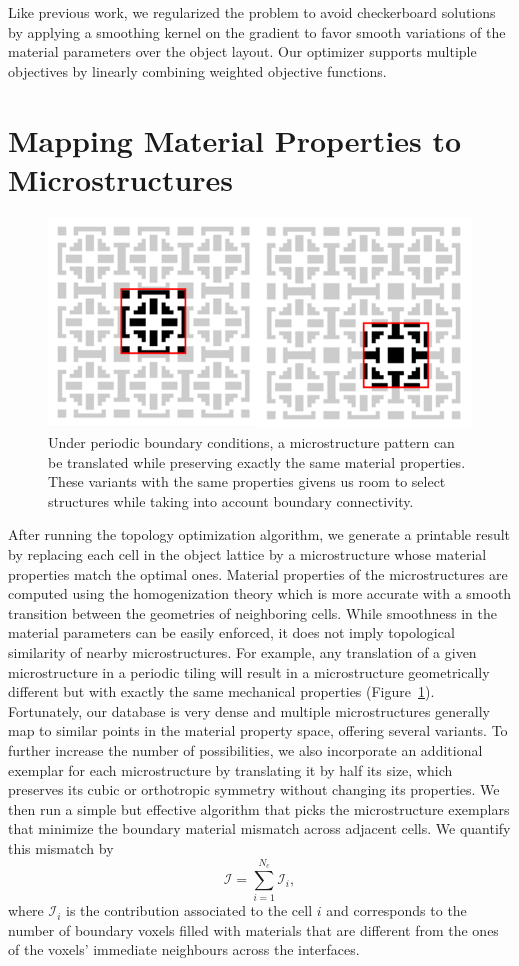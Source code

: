 Like previous work, we regularized the problem to avoid checkerboard solutions by applying a smoothing kernel on the 
gradient to favor smooth variations of the material parameters over the object layout.
Our optimizer supports multiple objectives by linearly combining weighted objective functions.
\section{Mapping Material Properties to Microstructures}
\begin{figure}
	\centering
 	\includegraphics[width=0.4\linewidth]{images/TranslatedMicrostructure.png}
 	\caption{Under periodic boundary conditions, a microstructure pattern can be translated while preserving exactly the same material properties.
		These variants with the same properties givens us room to select structures while taking into account boundary connectivity.}
 	\label{fig:translateMic}
\end{figure}
After running the topology optimization algorithm, we generate a printable result by replacing each cell in the object lattice by a microstructure whose material properties match the optimal ones.
Material properties of the microstructures are computed using the homogenization theory which is more accurate with a smooth transition between the geometries of neighboring cells.
While smoothness in the material parameters can be easily enforced, it does not imply topological similarity of nearby microstructures. 
For example, any translation of a given microstructure in a periodic tiling will result in a microstructure geometrically different but with exactly the same mechanical properties (Figure~\ref{fig:translateMic}). 
Fortunately, our database is very dense and multiple microstructures generally map to similar points in the material property space, offering several variants.
To further increase the number of possibilities, we also incorporate an additional exemplar for each microstructure by translating it by half its size, which preserves its cubic or orthotropic symmetry without changing its properties.
We then run a simple but effective algorithm that picks the microstructure exemplars that minimize the boundary material mismatch across adjacent cells.
We quantify this mismatch by 
\[\mathcal{I}=\sum_{i=1}^{N_c} \mathcal{I}_i,\]
where $\mathcal{I}_i$ is the contribution associated to the cell $i$ and corresponds to the number of boundary voxels filled with materials that are different from the ones of the voxels' immediate neighbours across the interfaces.

